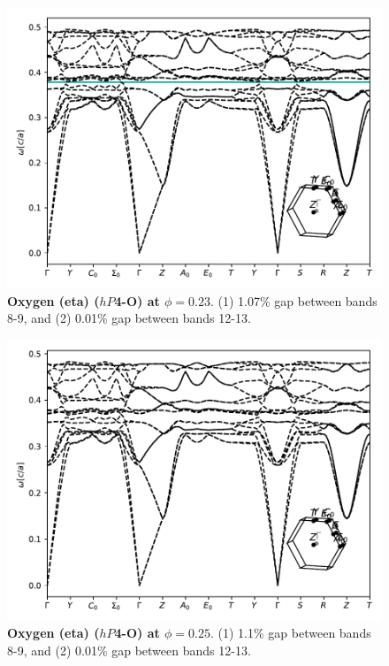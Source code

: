 \documentclass[fleqn,amsmath,amssymb,superscriptaddress, reprint,prl]{revtex4-1}
\begin{document}
\begin{figure}
\includegraphics[width=0.9\linewidth]{workspace/ad8217102215e7d3d71f7745566a20b1/images/r=32.pdf}
	\caption{\textbf{Oxygen (eta) ($hP$4-O) at $\phi=0.23$}. (1) 1.07\% gap between bands 8-9, and (2) 0.01\% gap between bands 12-13.}
\end{figure}

\begin{figure}
\includegraphics[width=0.9\linewidth]{workspace/ad8217102215e7d3d71f7745566a20b1/images/r=33.pdf}
	\caption{\textbf{Oxygen (eta) ($hP$4-O) at $\phi=0.25$}. (1) 1.1\% gap between bands 8-9, and (2) 0.01\% gap between bands 12-13.}
\end{figure}
\end{document}
